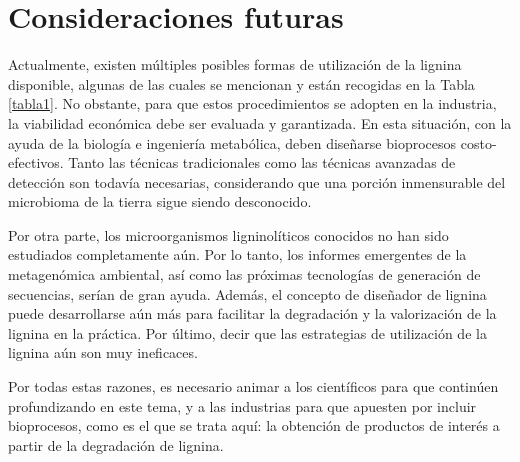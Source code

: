 \documentclass[final,a4paper,times,3p,onecolumn]{elsarticle}
\begin{document}
\section{Consideraciones futuras}
Actualmente, existen múltiples posibles formas de utilización de la lignina disponible, algunas de las cuales se mencionan y están recogidas en la Tabla\, \ref{tabla1}. No obstante, para que estos procedimientos se adopten en  la industria, la viabilidad económica debe ser evaluada y garantizada. En esta situación, con la ayuda de la biología e ingeniería metabólica, deben diseñarse bioprocesos costo-efectivos. Tanto las técnicas tradicionales como las técnicas avanzadas de detección son todavía necesarias, considerando que una porción inmensurable del microbioma de la tierra sigue siendo desconocido.

Por otra parte, los microorganismos ligninolíticos conocidos no han sido estudiados completamente aún. Por lo tanto, los informes emergentes de la metagenómica ambiental, así como las próximas tecnologías de generación de secuencias, serían de gran ayuda. Además, el concepto de diseñador de lignina puede desarrollarse aún más para facilitar la degradación y la valorización de la lignina en la práctica. Por último, decir que las estrategias de utilización de la lignina aún son muy ineficaces. 

Por todas estas razones, es necesario animar a los científicos para que continúen profundizando en este tema, y a las industrias para que apuesten por incluir bioprocesos, como es el que se trata aquí: la obtención de productos de interés a partir de la degradación de lignina.

 

\end{document}
